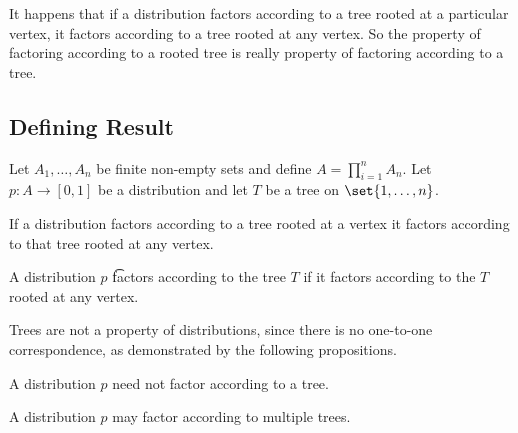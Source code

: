 

It happens that if a distribution factors according to a tree rooted at a particular vertex, it factors according to a tree rooted at any vertex.
So the property of factoring according to a rooted tree is really property of factoring according to a tree.


\subsection{Defining Result}

\begin{prop}

Let $A_1, \dots, A_n$ be finite non-empty sets and define $A = \prod_{i = 1}^{n} A_n$.
Let $p: A \to [0, 1]$ be a distribution and let $T$ be a tree on $\set{1, \dots, n}$.

\end{prop}

\begin{prop}

If a distribution factors according to a tree rooted at a vertex it factors according to that tree rooted at any vertex.

\end{prop}


A distribution $p$
\t{factors according to the tree}{} $T$
if it factors according to the
$T$ rooted at any vertex.


Trees are not a property of distributions,
since there is no one-to-one correspondence,
as demonstrated by the following propositions.


A distribution $p$ need not factor according to a tree.

A distribution
$p$ may factor according to multiple trees.
